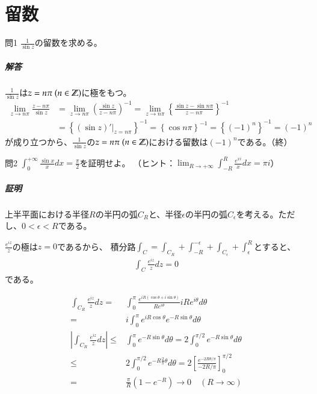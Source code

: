 \chapter{留数}%

\begin{mysimplebox}{問1}
    $\frac{1}{\sin z}$の留数を求める。
\end{mysimplebox}
\paragraph{解答}
$\frac{1}{\sin z}$は$z=n\pi\ (n\in\Z)$に極をもつ。
\begin{align*}
    \lim_{z\to n\pi}\frac{z-n\pi}{\sin z}
    &=\lim_{z\to n\pi}\left(\frac{\sin z}{z-n\pi}\right)^{-1}
    =\lim_{z\to n\pi}\left\{\frac{\sin z-\sin n\pi}{z-n\pi}\right\}^{-1}\\
    &=\left\{\left.\left(\sin z\right)'\right|_{z=n\pi}\right\}^{-1}
    =\left\{\cos n\pi\right\}^{-1}
    =\left\{(-1)^n\right\}^{-1}
    =(-1)^n
\end{align*}
が成り立つから、$\frac{1}{\sin z}$の$z=n\pi\ (n\in\Z)$における留数は$(-1)^n$である。（終）

\newpage
\begin{mysimplebox}{問2}
    $\int_{0}^{+\infty}\frac{\sin x}{x}dx=\frac{\pi}{2}$を証明せよ。
    （ヒント：$\lim_{R\to+\infty}\int_{-R}^{R}\frac{e^{xi}}{x}dx=\pi i$）
\end{mysimplebox}
\paragraph{証明}
上半平面における半径$R$の半円の弧$C_R$と、半径$\epsilon$の半円の弧$C_\epsilon$を考える。ただし、$0<\epsilon<R$である。

$\frac{e^{iz}}{z}$の極は$z=0$であるから、
積分路$\int_C=\int_{C_R}+\int_{-R}^{-\epsilon}+\int_{C_\epsilon}+\int_{\epsilon}^{R}$とすると、
\begin{align}
    \int_C\frac{e^{iz}}{z}dz=0\label{eq:ch7-toi2-1}
\end{align}
である。

\begin{align}
    \int_{C_R}\frac{e^{iz}}{z}dz
    =&\int_{0}^{\pi}\frac{e^{iR(\cos\theta+i\sin\theta)}}{Re^{i\theta}}iRe^{i\theta}d\theta\nonumber\\
    =&i\int_{0}^{\pi}e^{iR\cos\theta}e^{-R\sin\theta}d\theta\nonumber\\
    \left|\int_{C_R}\frac{e^{iz}}{z}dz\right|
    \le&\int_{0}^{\pi}e^{-R\sin\theta}d\theta
    =2\int_{0}^{\pi/2}e^{-R\sin\theta}d\theta\nonumber\\
    \le&2\int_{0}^{\pi/2}e^{-R\frac{2}{\pi}\theta}d\theta
    =2\left[\frac{e^{-2R\theta/\pi}}{-2R/\pi}\right]_0^{\pi/2}\nonumber\\
    =&\frac{\pi}{R}(1-e^{-R})
    \longrightarrow0\quad(R\longrightarrow\infty)\label{eq:ch7-toi2-2}
\end{align}

